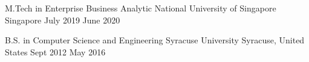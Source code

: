 

\begin{cventries}

  \cventry
    {M.Tech in Enterprise Business Analytic} %
    {National University of Singapore} %
    {Singapore} %
    {July 2019 \textemdash June 2020 } %
    {}

  \cventry
    {B.S. in Computer Science and Engineering} %
    {Syracuse University} %
    {Syracuse, United States} %
    {Sept 2012 \textemdash May 2016} %
    {}
    
\end{cventries}
